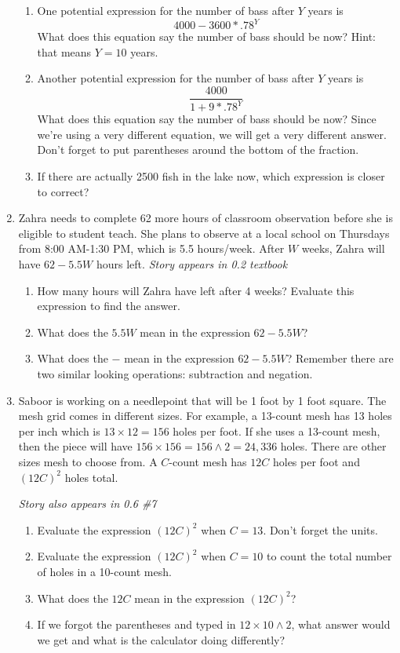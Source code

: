 \begin{enumerate}
\begin{enumerate}
\item One potential expression for the number of bass after $Y$ years is $$4000 - 3600*.78^Y$$ What does this equation say the number of bass should be now? Hint: that means $Y = 10$ years.
\item Another potential expression for the number of bass after $Y$ years is
$$\frac{4000}{1 + 9*.78^Y}$$
What does this equation say the number of bass should be now?  Since we're using a very different equation, we will get a very different answer.  Don't forget to put parentheses around the bottom of the fraction.
\item If there are actually 2500 fish in the lake now, which expression is closer to correct?
\end{enumerate}

\item Zahra needs to complete 62 more hours of classroom observation before she is eligible to student teach.  She plans to observe at a local school on Thursdays from 8:00 AM-1:30 PM, which is 5.5 hours/week. After $W$ weeks, Zahra will have $62-5.5W$ hours left.  \hfill \emph{Story appears in 0.2 textbook}
\begin{enumerate}
\item How many hours will Zahra have left after 4 weeks? Evaluate this expression to find the answer.
\item What does the $5.5W$ mean in the expression $62-5.5W$?
\item What does the $-$ mean in the expression $62-5.5W$?  Remember there are two similar looking operations: subtraction and negation.
\end{enumerate}

\item Saboor is working on a needlepoint that will be 1 foot by 1 foot square. The mesh grid comes in different sizes.  For example, a 13-count mesh has 13 holes per inch which is $13 \times 12=156$ holes per foot.  If she uses a 13-count mesh, then the piece will have $156 \times 156 = 156 \land 2 = 24,336$ holes. There are other sizes mesh to choose from.  A $C$-count mesh has $12C$ holes per foot and $(12C)^2$ holes total. 

\hfill \emph{Story also appears in 0.6 \#7}
\begin{enumerate}
\item Evaluate the expression $(12C)^2$ when $C=13$. Don't forget the units.
\item Evaluate the expression $(12C)^2$ when $C=10$ to count the total number of holes in a 10-count mesh.
\item What does the $12C$ mean in the expression $(12C)^2$?  
\item If we forgot the parentheses and typed in $12 \times 10 \land 2$, what answer would we get and what is the calculator doing differently?
\end{enumerate}

\end{enumerate}

